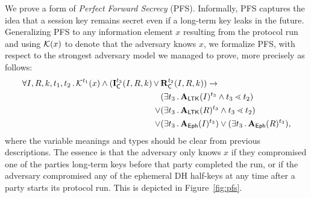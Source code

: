 We prove a form of \emph{Perfect Forward Secrecy} (PFS).
%
Informally, PFS captures the idea that a session key remains secret even if
a long-term key leaks in the future.
%
Generalizing PFS to any information element $x$ resulting from the protocol run
and using $\mathcal{K}(x)$ to denote that the adversary knows $x$, we formalize PFS, with
respect to the strongest adversary model we managed to prove,
more precisely as follows:
%
\begin{align*}
    \forall I, R, k, t_1, t_2\operatorname{.}
    \mathcal{K}^{t_1}(x) \land (\mathbf{I}_{\textsf{C}}^{t_2}(I, R, k)\, \lor\, & \mathbf{R}_{\textsf{C}}^{t_2}(I, R, k))
    \rightarrow\\
    &(\exists t_3\operatorname{.} \mathbf{A}_{\textsf{LTK}}(I)^{t_3} \land t_3 \lessdot t_2)\\
    \lor&(\exists t_3\operatorname{.} \mathbf{A}_{\textsf{LTK}}(R)^{t_3} \land t_3 \lessdot t_2)\\
    \lor&(\exists t_3\operatorname{.} \mathbf{A}_{\textsf{Eph}}(I)^{t_3})
    \lor(\exists t_3\operatorname{.} \mathbf{A}_{\textsf{Eph}}(R)^{t_3}),
\end{align*}
%
where the variable meanings and types should be clear from previous
descriptions.
%
The essence is that the adversary only knows $x$ if they compromised one of the
parties long-term keys before that party completed the run, or if the adversary
compromised any of the ephemeral DH half-keys at any time after a party starts
its protocol run.
%
This is depicted in Figure~\ref{fig:pfs}.
%
